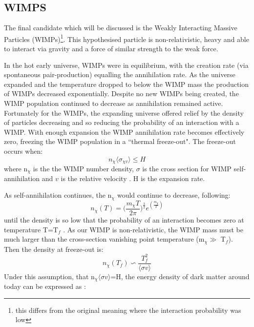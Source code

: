 \subsection{WIMPS}
\label{sec:wimp_as_a_candidate}
\par
The final candidate which will be discussed is the Weakly Interacting Massive Particles (WIMPs)\footnote{this differs from the original meaning where the interaction probability was low}.
This hypothesised particle is non-relativistic, heavy and able to interact via gravity and a force of similar strength to the weak force.
\par
In the hot early universe, WIMPs were in equilibrium, with the creation rate (via spontaneous pair-production) equalling the annihilation rate.
As the universe expanded and the temperature dropped to below the WIMP mass the production of WIMPs decreased exponentially.
Despite no new WIMPs being created, the WIMP population continued to decrease as annihilation remained active.
Fortunately for the WIMPs, the expanding universe offered relief by the density of particles decreasing and so reducing the probability of an interaction with a WIMP.
With enough expansion the WIMP annihilation rate becomes effectively zero, freezing the WIMP population in a ``thermal freeze-out".
The freeze-out occurs when:
\begin{equation}
    n_\chi \langle \sigma_{\chi v} \rangle \leq H
\end{equation}
where n$_\chi$ is the the WIMP number density, $\sigma$ is the cross section for WIMP self-annihilation and $v$ is the relative velocity \cite{wimp_theory_ref}.
H is the expansion rate.
\par
As self-annihilation continues, the n$_\chi$ would continue to decrease, following:
\begin{equation}
    n_\chi(T) = \bigg(\frac{m_\chi T}{2\pi}\bigg)^{\frac{3}{2}} e^{(\frac{m_\chi}{T})}
\end{equation}
until the density is so low that the probability of an interaction becomes zero at temperature T=T$_f$ \cite{wimp_theory_ref}.
As our WIMP is non-relativistic, the WIMP mass must be much larger than the cross-section vanishing point temperature (m$_\chi \gg$ T$_f$).
Then the density at freeze-out is:
\begin{equation}
    n_\chi(T_f) \backsim \frac{T^2_f}{\langle \sigma v \rangle}
\end{equation}
Under this assumption, that n$_\chi \langle \sigma v \rangle$=H, the energy density of dark matter around today can be expressed as \cite{less_of_a_wimp_miracle_ref}:
